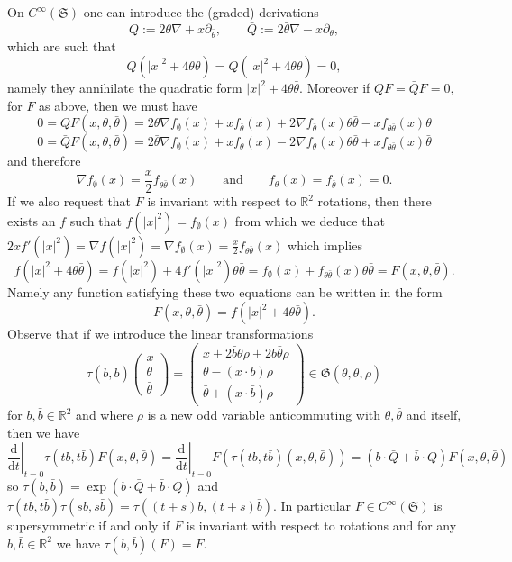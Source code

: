 \documentclass[a4paper,10pt]{article}
\newcommand{\assign}{:=}
\newcommand{\mathd}{\mathrm{d}}
\begin{document}
On $C^{\infty} (\mathfrak{S})$ one can introduce the (graded) derivations
\[ Q \assign 2 \theta \nabla + x \partial_{\bar{\theta}}, \qquad \bar{Q}
   \assign 2 \bar{\theta} \nabla - x \partial_{\theta}, \]
which are such that
\[ Q (| x |^2 + 4 \theta \bar{\theta}) = \bar{Q} (| x |^2 + 4 \theta
   \bar{\theta}) = 0, \]
namely they annihilate the quadratic form $| x |^2 + 4 \theta \bar{\theta}$.
Moreover if $Q F = \bar{Q} F = 0$, for $F$ as above, then we must have
\[ 0 = Q F (x, \theta, \bar{\theta}) = 2 \theta \nabla f_{\emptyset} (x) + x
   f_{\bar{\theta}} (x) + 2 \nabla f_{\bar{\theta}} (x) \theta \bar{\theta} -
   x f_{\theta \bar{\theta}} (x) \theta \]
\[ 0 = \bar{Q} F (x, \theta, \bar{\theta}) = 2 \bar{\theta} \nabla
   f_{\emptyset} (x) + x f_{\theta} (x) - 2 \nabla f_{\theta} (x) \theta
   \bar{\theta} + x f_{\theta \bar{\theta}} (x) \bar{\theta} \]
and therefore
\[ \nabla f_{\emptyset} (x) = \frac{x}{2} f_{\theta \bar{\theta}} (x) \qquad
   \text{and} \qquad f_{\theta} (x) = f_{\bar{\theta}} (x) = 0. \]
If we also request that $F$ is invariant with respect to $\mathbb{R}^2$
rotations, then there exists an $f$ such that $f (| x |^2) = f_{\emptyset}
(x)$ from which we deduce that $2 x f' (| x |^2) = \nabla f (| x |^2) = \nabla
f_{\emptyset} (x) = \frac{x}{2} f_{\theta \bar{\theta}} (x)$ which implies
\[ f (| x |^2 + 4 \theta \bar{\theta}) = f (| x |^2) + 4 f' (| x |^2) \theta
   \bar{\theta} = f_{\emptyset} (x) + f_{\theta \bar{\theta}} (x) \theta
   \bar{\theta} = F (x, \theta, \bar{\theta}) . \]
Namely any function satisfying these two equations can be written in the form
\[ F (x, \theta, \bar{\theta}) = f (| x |^2 + 4 \theta \bar{\theta}) . \]
Observe that if we introduce the linear transformations
\[ \tau (b, \bar{b}) \left(\begin{array}{c}
     x\\
     \theta\\
     \bar{\theta}
   \end{array}\right) = \left(\begin{array}{c}
     x + 2 \bar{b} \theta \rho + 2 b \bar{\theta} \rho\\
     \theta - (x \cdot b) \rho\\
     \bar{\theta} + (x \cdot \bar{b}) \rho
   \end{array}\right) \in \mathfrak{G} (\theta, \bar{\theta}, \rho) \]
for $b, \bar{b} \in \mathbb{R}^2$ and where $\rho$ is a new odd variable
anticommuting with $\theta, \bar{\theta}$ and itself, then we have
\[ \left. \frac{\mathd}{\mathd t} \right|_{t = 0} \tau (t b, t \bar{b}) F (x,
   \theta, \bar{\theta}) = \left. \frac{\mathd}{\mathd t} \right|_{t = 0} F
   (\tau (t b, t \bar{b}) (x, \theta, \bar{\theta})) = (b \cdot \bar{Q} +
   \bar{b} \cdot Q) F (x, \theta, \bar{\theta}) \]
so $\tau (b, \bar{b}) = \exp (b \cdot \bar{Q} + \bar{b} \cdot Q)$ and $\tau (t
b, t \bar{b}) \tau (s b, s \bar{b}) = \tau ((t + s) b, (t + s) \bar{b})$. In
particular $F \in C^{\infty} (\mathfrak{S})$ is supersymmetric if and only if
$F$ is invariant with respect to rotations and for any $b, \bar{b} \in
\mathbb{R}^2$ we have $\tau (b, \bar{b}) (F) = F$.
\end{document}
